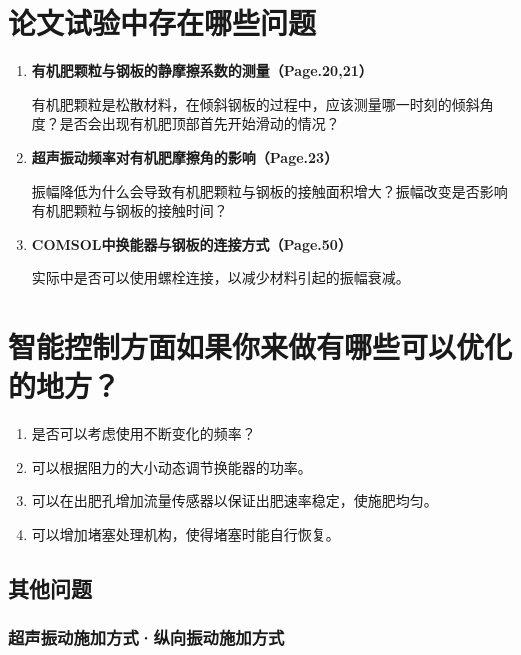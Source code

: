 \documentclass[a4paper,12pt,fontset=none,titlepage]{ctexart}
\begin{document}
\section{论文试验中存在哪些问题}

\begin{enumerate}
	\item \textbf{有机肥颗粒与钢板的静摩擦系数的测量（Page.20,21）}
	
   有机肥颗粒是松散材料，在倾斜钢板的过程中，应该测量哪一时刻的倾斜角度？是否会出现有机肥顶部首先开始滑动的情况？

   \item \textbf{超声振动频率对有机肥摩擦角的影响（Page.23）}
   \begin{quote}
   \end{quote}
   
   振幅降低为什么会导致有机肥颗粒与钢板的接触面积增大？振幅改变是否影响有机肥颗粒与钢板的接触时间？
   
   \item \textbf{COMSOL中换能器与钢板的连接方式（Page.50）}
   
   实际中是否可以使用螺栓连接，以减少材料引起的振幅衰减。
\end{enumerate}

\section{智能控制方面如果你来做有哪些可以优化的地方？}

\begin{enumerate}
	\item 是否可以考虑使用不断变化的频率？
	\item 可以根据阻力的大小动态调节换能器的功率。
	\item 可以在出肥孔增加流量传感器以保证出肥速率稳定，使施肥均匀。
	\item 可以增加堵塞处理机构，使得堵塞时能自行恢复。
\end{enumerate}

\subsection{其他问题}

\subsubsection{超声振动施加方式·纵向振动施加方式}
\end{document}
